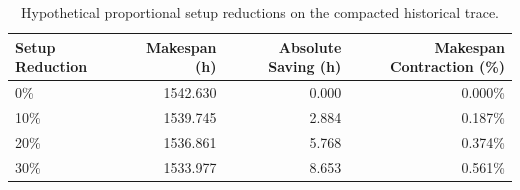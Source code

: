 \begin{table}[!htbp]
\centering
\caption{Hypothetical proportional setup reductions on the compacted historical trace.}
\label{tab:trace_reductions}
\renewcommand{\arraystretch}{1.15}
\small
\begin{tabularx}{\textwidth}{Xrrr}
\toprule
\textbf{Setup Reduction} & \textbf{Makespan (h)} & \textbf{Absolute Saving (h)} & \textbf{Makespan Contraction (\%)} \\
\midrule
0\% & 1542.630 & 0.000 & 0.000\% \\
10\% & 1539.745 & 2.884 & 0.187\% \\
20\% & 1536.861 & 5.768 & 0.374\% \\
30\% & 1533.977 & 8.653 & 0.561\% \\
\bottomrule
\end{tabularx}
\end{table}
